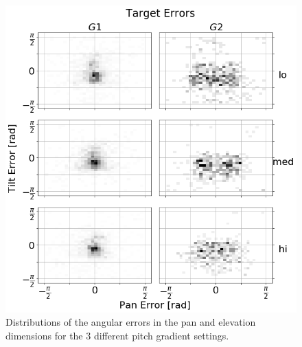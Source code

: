 \documentclass{article}
\begin{document}
\begin{figure}
  \centering
  \includegraphics[width=1.0\textwidth]{figures/target_errors.png}
  \caption{Distributions of the angular errors in the pan and elevation dimensions for the 3 different pitch gradient settings. }\label{fig:target-errors}
\end{figure}
\end{document}
